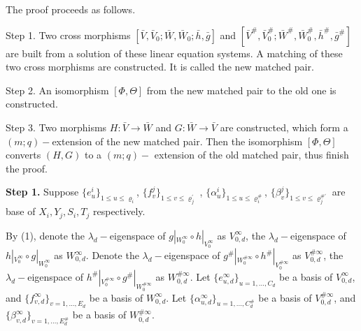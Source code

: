 \def\CTEXPreproc{Created by ctex v0.2.12, don't edit!}\documentclass[11pt]{article}
\begin{document}
   \begin{pf}  The proof proceeds as follows.

   \noindent Step 1. Two cross morphisms  $[\bar{V},\bar{V}_0 ; \bar{W}, \bar{W}_0 ; \bar{h},\bar{g}  ]$ and $[\bar{V}^{\#} , \bar{V}^{\#}_0 ; \bar{W}^{\#} , \bar{W}^{\#}_0 , \bar{h}^{\#}, \bar{g}^{\#}   ]$ are built
   from a solution of these linear equation systems. A matching of these two cross morphisms are constructed. It is called the new matched pair.

    \noindent Step 2. An isomorphism $[ \Phi ,\Theta ]$  from the new  matched pair to the old one is constructed.

    \noindent Step 3. Two morphisms $H: \bar{V} \rightarrow \bar{W}$ and $G: \bar{W} \rightarrow \bar{V}$ are constructed, which form a
$(m;q)-$extension of the new matched pair. Then the isomorphism $[\Phi, \Theta]$ converts $(H,G)$ to a $(m;q)-$ extension of the old
matched pair, thus finish the proof.








  \noindent \textbf{Step 1.}  Suppose $\{ e^i _u \}_{1\leq u\leq \varrho_i  }$, $\{ f^j _v \}_{1\leq v\leq \varrho^{'} _j    } $ , $\{ \alpha^i _u \}_{1\leq u\leq \varrho^{\#}_i   }$, $\{ \beta^j _v \}_{ 1\leq v \leq \varrho^{\# '}_j }$ are base of $X_i , Y_j , S_i , T_j$ respectively.

  By (1), denote the $\lambda_{d}-$eigenspace of $g|_{W^{\infty}_0 }\circ h|_{V^{\infty}_0 } $ as $V^{\infty}_{0,d}  $,  the $\lambda_{d}-$eigenspace of $ h|_{V^{\infty}_0 } \circ g|_{W^{\infty}_0 }$ as $W^{\infty}_{0,d}  $.
  Denote the $\lambda_{d}-$eigenspace of $g^{\#}|_{W^{\# \infty}_0 }\circ h^{\#}|_{V^{\# \infty}_0 } $ as $V^{\# \infty}_{0,d}  $,  the $\lambda_{d}-$eigenspace of $ h^{\#}|_{V^{\# \infty}_0 } \circ g^{\#}|_{W^{\# \infty}_0 }$ as $W^{\# \infty}_{0,d}  $.
   Let
   $\{  e^{\infty}_{u,d}  \}_{u=1,...,C_d }  $ be a basis of  $V^{\infty}_{0,d}  $, and  $\{  f^{\infty}_{v,d}  \}_{v=1,...,E_d }  $ be a basis of  $W^{\infty}_{0,d}$.   Let
   $\{  {\alpha}^{ \infty}_{u,d}  \}_{u=1,...,C^{\#}_d }  $ be a basis of  $V^{\# \infty}_{0,d}  $, and  $\{  {\beta}^{\infty}_{v,d}  \}_{v=1,...,E^{\#}_d }  $ be a basis of  $W^{\# \infty}_{0,d}$.




\end{pf}
\end{document}
